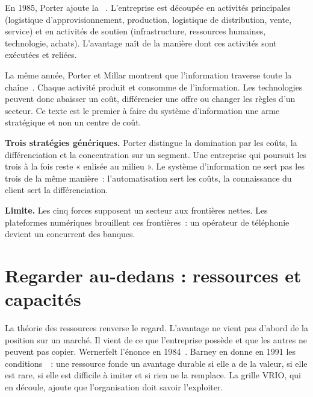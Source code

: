 En 1985, Porter ajoute la ~\cite{porter1985}. L'entreprise est découpée en activités
principales (logistique d'approvisionnement, production, logistique de distribution, vente, service) et en
activités de soutien (infrastructure, ressources humaines, technologie, achats). L'avantage naît de la manière
dont ces activités sont exécutées et reliées.

La même année, Porter et Millar montrent que l'information traverse toute la chaîne~\cite{portermillar1985}.
Chaque activité produit et consomme de l'information. Les technologies peuvent donc abaisser un coût,
différencier une offre ou changer les règles d'un secteur. Ce texte est le premier à faire du système
d'information une arme stratégique et non un centre de coût.

\begin{boxinfo}
\textbf{Trois stratégies génériques.} Porter distingue la domination par les coûts, la différenciation et la
concentration sur un segment. Une entreprise qui poursuit les trois à la fois reste « enlisée au milieu ». Le
système d'information ne sert pas les trois de la même manière~: l'automatisation sert les coûts, la
connaissance du client sert la différenciation.
\end{boxinfo}

\textbf{Limite.} Les cinq forces supposent un secteur aux frontières nettes. Les plateformes numériques
brouillent ces frontières~: un opérateur de téléphonie devient un concurrent des banques.

\section{Regarder au-dedans : ressources et capacités}
\label{sec:c02-ressources}

La théorie des ressources renverse le regard. L'avantage ne vient pas d'abord de la position sur un marché. Il
vient de ce que l'entreprise possède et que les autres ne peuvent pas copier. Wernerfelt l'énonce en
1984~\cite{wernerfelt1984}. Barney en donne en 1991 les conditions~\cite{barney1991}~: une ressource fonde un
avantage durable si elle a de la valeur, si elle est rare, si elle est difficile à imiter et si rien ne la
remplace. La grille VRIO, qui en découle, ajoute que l'organisation doit savoir l'exploiter.

